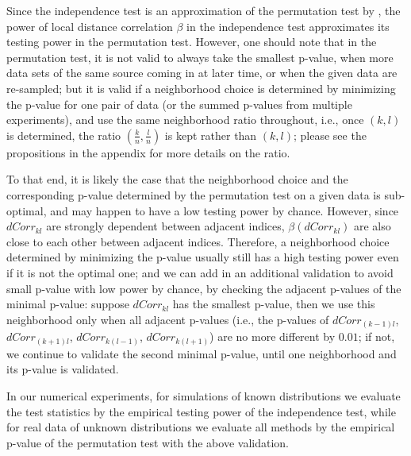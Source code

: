 \documentclass[12pt]{article}
\begin{document}
Since the independence test is an approximation of the permutation test by \cite{LehnmanRomanoStatBook}, the power of local distance correlation $\beta$ in the independence test approximates its testing power in the permutation test. However, one should note that in the permutation test, it is not valid to always take the smallest p-value, when more data sets of the same source coming in at later time, or when the given data are re-sampled; but it is valid if a neighborhood choice is determined by minimizing the p-value for one pair of data (or the summed p-values from multiple experiments), and use the same neighborhood ratio throughout, i.e., once $(k,l)$ is determined, the ratio $(\frac{k}{n}, \frac{l}{n})$ is kept rather than $(k,l)$; please see the propositions in the appendix for more details on the ratio.

To that end, it is likely the case that the neighborhood choice and the corresponding p-value determined by the permutation test on a given data is sub-optimal, and may happen to have a low testing power by chance. However, since $dCorr_{kl}$ are strongly dependent between adjacent indices, $\beta(dCorr_{kl})$ are also close to each other between adjacent indices. Therefore, a neighborhood choice determined by minimizing the p-value usually still has a high testing power even if it is not the optimal one; and we can add in an additional validation to avoid small p-value with low power by chance, by checking the adjacent p-values of the minimal p-value: suppose $dCorr_{kl}$ has the smallest p-value, then we use this neighborhood only when all adjacent p-values (i.e., the p-values of $dCorr_{(k-1)l}$, $dCorr_{(k+1)l}$, $dCorr_{k(l-1)}$, $dCorr_{k(l+1)}$) are no more different by $0.01$; if not, we continue to validate the second minimal p-value, until one neighborhood and its p-value is validated.

In our numerical experiments, for simulations of known distributions we evaluate the test statistics by the empirical testing power of the independence test, while for real data of unknown distributions we evaluate all methods by the empirical p-value of the permutation test with the above validation. 

\end{document}
